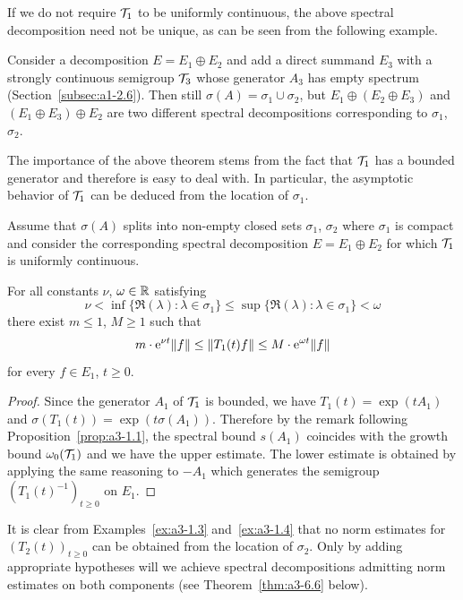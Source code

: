 \begin{example*}
If we do not require $\mathcal{T}_{1}$ to be uniformly continuous, the above spectral decomposition need not be unique, as can be seen from the following example. 

Consider a decomposition $E = E_{1} \oplus E_{2}$ and add a direct summand $E_{3}$ with a strongly continuous semigroup $\mathcal{T}_{3}$ whose generator $A_{3}$ has empty spectrum (\eg Section~\ref{subsec:a1-2.6}).
Then still $\sigma(A) = \sigma_{1} \cup \sigma_{2}$, but $E_{1} \oplus (E_{2} \oplus E_{3})$ and $(E_{1} \oplus E_{3}) \oplus E_{2}$ are two different spectral decompositions corresponding to $\sigma_{1}$, $\sigma_{2}$.
\end{example*}
The importance of the above theorem stems from the fact that $\mathcal{T}_{1}$ has a bounded generator and therefore is easy to deal with.
In particular, the asymptotic behavior of\/ $\mathcal{T}_{1}$ can be deduced from the location of\/ $\sigma_{1}$.
\begin{corollary}\label{cor:a3-3.4}
Assume that $\sigma(A)$ splits into non-empty closed sets $\sigma_{1}$, $\sigma_{2}$ where $\sigma_{1}$ is compact and consider the corresponding spectral decomposition $E = E_{1} \oplus E_{2}$ for which $\mathcal{T}_{1}$ is uniformly continuous.

For all constants $\nu$, $\omega \in \mathbb{R}$ satisfying
\[
\nu < \inf \{\Re(\lambda) \colon \lambda \in \sigma_{1}\} \leq \sup \{\Re(\lambda) \colon \lambda \in \sigma_{1}\} < \omega
\]
there exist $m \leq 1$, $M \geq 1$ such that
\[
m \cdot \eu^{\nu t}\|f\| \leq \|T_{1}(t)f\| \leq M \cdot \eu^{\omega t}\|f\|
\]
for every $f \in E_{1}$, $t \geq 0$.
\end{corollary}
\begin{proof}
Since the generator $A_{1}$ of\/ $\mathcal{T}_{1}$ is bounded, we have $T_{1}(t) = \exp(tA_{1})$ and $\sigma(T_{1}(t)) = \exp(t\sigma(A_{1}))$.
Therefore by the remark following Proposition~\ref{prop:a3-1.1}, the spectral bound $s(A_{1})$ coincides with the growth bound $\omega_{0}(\mathcal{T}_{1})$ and we have the upper estimate.
The lower estimate is obtained by applying the same reasoning to $-A_{1}$ which generates the semigroup $(T_{1}(t)^{-1})_{t \geq 0}$ on $E_{1}$.
\end{proof}
It is clear from Examples~\ref{ex:a3-1.3} and~\ref{ex:a3-1.4} that no norm estimates for $(T_{2}(t))_{t \geq 0}$ can be obtained from the location of\/ $\sigma_{2}$.
Only by adding appropriate hypotheses will we achieve spectral decompositions admitting norm estimates on both components (see Theorem~\ref{thm:a3-6.6} below).

